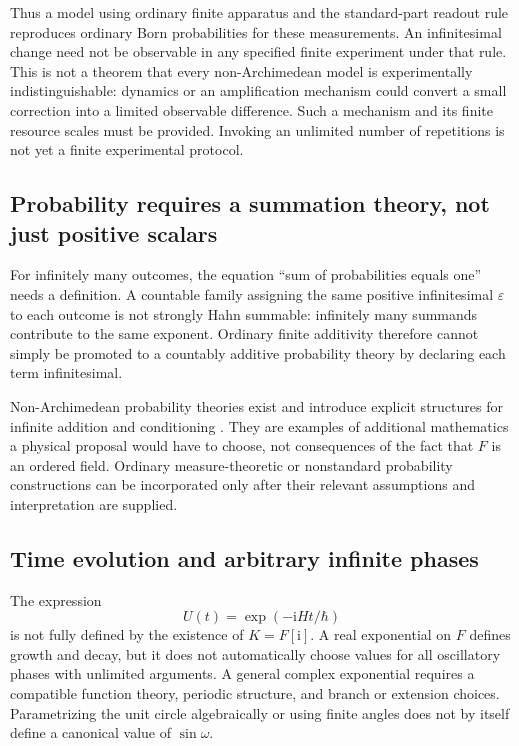 \documentclass[11pt,letterpaper]{article}
\newcommand{\eps}{\varepsilon}
\newcommand{\ii}{\mathrm{i}}
\theoremstyle{definition}
\theoremstyle{remark}
\begin{document}
Thus a model using ordinary finite apparatus and the standard-part readout
rule reproduces ordinary Born probabilities for these measurements. An
infinitesimal change need not be observable in any specified finite experiment
under that rule. This is not a theorem that every non-Archimedean model is
experimentally indistinguishable: dynamics or an amplification mechanism could
convert a small correction into a limited observable difference. Such a
mechanism and its finite resource scales must be provided. Invoking an
unlimited number of repetitions is not yet a finite experimental protocol.

\subsection{Probability requires a summation theory, not just positive scalars}

For infinitely many outcomes, the equation ``sum of probabilities equals one''
needs a definition. A countable family assigning the same positive
infinitesimal $\eps$ to each outcome is not strongly Hahn summable: infinitely
many summands contribute to the same exponent. Ordinary finite additivity
therefore cannot simply be promoted to a countably additive probability theory
by declaring each term infinitesimal.

Non-Archimedean probability theories exist and introduce explicit structures
for infinite addition and conditioning \cite{BenciHorstenWenmackers}. They are
examples of additional mathematics a physical proposal would have to choose,
not consequences of the fact that $F$ is an ordered field. Ordinary
measure-theoretic or nonstandard probability constructions can be incorporated
only after their relevant assumptions and interpretation are supplied.

\subsection{Time evolution and arbitrary infinite phases}

The expression
\[
 U(t)=\exp(-\ii Ht/\hbar)
\]
is not fully defined by the existence of $K=F[\ii]$. A real exponential on $F$
defines growth and decay, but it does not automatically choose values for
all oscillatory phases with unlimited arguments. A general complex exponential
requires a compatible function theory, periodic structure, and branch or
extension choices. Parametrizing the unit circle algebraically or using finite
angles does not by itself define a canonical value of $\sin\omega$.
\end{document}
